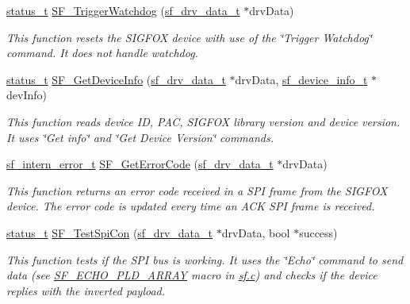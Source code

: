 \begin{DoxyCompactItemize}
\mbox{\hyperlink{group__ksdk__common_gaaabdaf7ee58ca7269bd4bf24efcde092}{status\+\_\+t}} \mbox{\hyperlink{group__sf__functions__group_gab933b60af5327c7f6289680308f94d5f}{S\+F\+\_\+\+Trigger\+Watchdog}} (\mbox{\hyperlink{structsf__drv__data__t}{sf\+\_\+drv\+\_\+data\+\_\+t}} $\ast$drv\+Data)
\begin{DoxyCompactList}\small\item\em This function resets the S\+I\+G\+F\+OX device with use of the \char`\"{}\+Trigger Watchdog\char`\"{} command. It does not handle watchdog. \end{DoxyCompactList}\item 
\mbox{\hyperlink{group__ksdk__common_gaaabdaf7ee58ca7269bd4bf24efcde092}{status\+\_\+t}} \mbox{\hyperlink{group__sf__functions__group_gac2350dad3fd06accd548ec1e4c761239}{S\+F\+\_\+\+Get\+Device\+Info}} (\mbox{\hyperlink{structsf__drv__data__t}{sf\+\_\+drv\+\_\+data\+\_\+t}} $\ast$drv\+Data, \mbox{\hyperlink{structsf__device__info__t}{sf\+\_\+device\+\_\+info\+\_\+t}} $\ast$dev\+Info)
\begin{DoxyCompactList}\small\item\em This function reads device ID, P\+AC, S\+I\+G\+F\+OX library version and device version. It uses \char`\"{}\+Get info\char`\"{} and \char`\"{}\+Get Device Version\char`\"{} commands. \end{DoxyCompactList}\item 
\mbox{\hyperlink{group__sf__enum__group_ga9f14f69f90dfff97b98977db7a73ba68}{sf\+\_\+intern\+\_\+error\+\_\+t}} \mbox{\hyperlink{group__sf__functions__group_ga83b0684858db1e51ddd77c542db9570a}{S\+F\+\_\+\+Get\+Error\+Code}} (\mbox{\hyperlink{structsf__drv__data__t}{sf\+\_\+drv\+\_\+data\+\_\+t}} $\ast$drv\+Data)
\begin{DoxyCompactList}\small\item\em This function returns an error code received in a S\+PI frame from the S\+I\+G\+F\+OX device. The error code is updated every time an A\+CK S\+PI frame is received. \end{DoxyCompactList}\item 
\mbox{\hyperlink{group__ksdk__common_gaaabdaf7ee58ca7269bd4bf24efcde092}{status\+\_\+t}} \mbox{\hyperlink{group__sf__functions__group_ga52dd2f875d8870319466379dc564c6ea}{S\+F\+\_\+\+Test\+Spi\+Con}} (\mbox{\hyperlink{structsf__drv__data__t}{sf\+\_\+drv\+\_\+data\+\_\+t}} $\ast$drv\+Data, bool $\ast$success)
\begin{DoxyCompactList}\small\item\em This function tests if the S\+PI bus is working. It uses the \char`\"{}\+Echo\char`\"{} command to send data (see \mbox{\hyperlink{sf_8c_ab3c5eabcda72b90257fd5cc48b500a5a}{S\+F\+\_\+\+E\+C\+H\+O\+\_\+\+P\+L\+D\+\_\+\+A\+R\+R\+AY}} macro in \mbox{\hyperlink{sf_8c}{sf.\+c}}) and checks if the device replies with the inverted payload. \end{DoxyCompactList}\item 

\end{DoxyCompactItemize}
